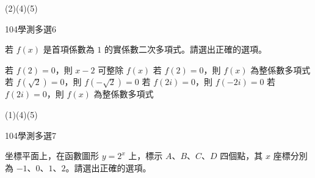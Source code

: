 \begin{QUESTIONS}
\begin{QUESTION}
\begin{QANS}
            (2)(4)(5)
        \end{QANS}
        \begin{QSOLLIST}
        \end{QSOLLIST}
        \begin{QEMPTYSPACE}
        \end{QEMPTYSPACE}
    \end{QUESTION}
    \begin{QUESTION}
        \begin{ExamInfo}{104}{學測}{多選}{6}
        \end{ExamInfo}
        \begin{ExamAnsRateInfo}{45}{74}{43}{18}
        \end{ExamAnsRateInfo}
        \begin{QBODY}
			若 $f\left( x \right)$ 是首項係數為 $1$ 的實係數二次多項式。請選出正確的選項。
			\begin{QOPS}
				\QOP 若 $f\left( 2 \right)=0$，則 $x-2$ 可整除 $f\left( x \right)$
				\QOP 若 $f\left( 2 \right)=0$，則 $f\left( x \right)$ 為整係數多項式
				\QOP 若 $f\left( \sqrt{2} \right)=0$，則 $f\left( -\sqrt{2} \right)=0$
				\QOP 若 $f\left( 2i \right)=0$，則 $f\left( -2i \right)=0$
				\QOP 若 $f\left( 2i \right)=0$，則 $f\left( x \right)$ 為整係數多項式
			\end{QOPS}
        \end{QBODY}
        \begin{QFROMS}
        \end{QFROMS}
        \begin{QTAGS}\end{QTAGS}
        \begin{QANS}
            (1)(4)(5)
        \end{QANS}
        \begin{QSOLLIST}
        \end{QSOLLIST}
        \begin{QEMPTYSPACE}
        \end{QEMPTYSPACE}
    \end{QUESTION}
    \begin{QUESTION}
        \begin{ExamInfo}{104}{學測}{多選}{7}
        \end{ExamInfo}
        \begin{ExamAnsRateInfo}{67}{92}{77}{32}
        \end{ExamAnsRateInfo}
        \begin{QBODY}
			坐標平面上，在函數圖形 $y={{2}^{x}}$ 上，標示 $A$、$B$、$C$、$D$ 四個點，其 $x$ 座標分別為 $-1$、$0$、$1$、$2$。請選出正確的選項。

\end{QBODY}
\end{QUESTION}
\end{QUESTIONS}
